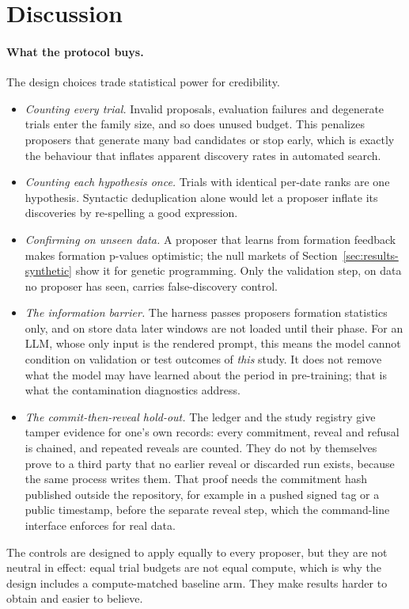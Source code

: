 \section{Discussion}
\label{sec:discussion}

\paragraph{What the protocol buys.} The design choices trade statistical
power for credibility.
\begin{itemize}
  \item \emph{Counting every trial.} Invalid proposals, evaluation failures
    and degenerate trials enter the family size, and so does unused budget.
    This penalizes proposers that generate many bad candidates or stop
    early, which is exactly the behaviour that inflates apparent discovery
    rates in automated search.
  \item \emph{Counting each hypothesis once.} Trials with identical per-date
    ranks are one hypothesis. Syntactic deduplication alone would let a
    proposer inflate its discoveries by re-spelling a good expression.
  \item \emph{Confirming on unseen data.} A proposer that learns from
    formation feedback makes formation p-values optimistic; the null markets
    of Section~\ref{sec:results-synthetic} show it for genetic programming.
    Only the validation step, on data no proposer has seen, carries
    false-discovery control.
  \item \emph{The information barrier.} The harness passes proposers
    formation statistics only, and on store data later windows are not
    loaded until their phase. For an LLM, whose only input is the rendered
    prompt, this means the model cannot condition on validation or test
    outcomes of \emph{this} study. It does not remove what the model may
    have learned about the period in pre-training; that is what the
    contamination diagnostics address.
  \item \emph{The commit-then-reveal hold-out.} The ledger and the study
    registry give tamper evidence for one's own records: every commitment,
    reveal and refusal is chained, and repeated reveals are counted. They do
    not by themselves prove to a third party that no earlier reveal or
    discarded run exists, because the same process writes them. That proof
    needs the commitment hash published outside the repository, for example
    in a pushed signed tag or a public timestamp, before the separate reveal
    step, which the command-line interface enforces for real data.
\end{itemize}
The controls are designed to apply equally to every proposer, but they are
not neutral in effect: equal trial budgets are not equal compute, which is
why the design includes a compute-matched baseline arm. They make results
harder to obtain and easier to believe.

